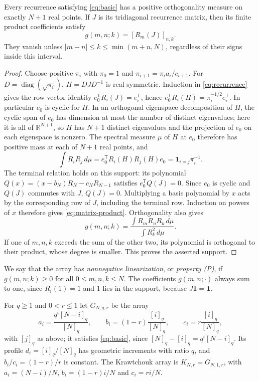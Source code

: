 \begin{lemma}\label{lem:finite}
Every recurrence satisfying \eqref{eq:basic} has a positive orthogonality measure on exactly $N+1$ real points. If $J$ is its tridiagonal recurrence matrix, then its finite product coefficients satisfy
\begin{equation}\label{eq:matrix-product}
g(m,n;k)=[R_m(J)]_{n,k}.
\end{equation}
They vanish unless $|m-n|\leq k\leq\min(m+n,N)$, regardless of their signs inside this interval.
\end{lemma}
\begin{proof}
Choose positive $\pi_i$ with $\pi_0=1$ and $\pi_{i+1}=\pi_i a_i/c_{i+1}$. For $D=\operatorname{diag}(\sqrt{\pi_i})$, $H=DJD^{-1}$ is real symmetric. Induction in \eqref{eq:recurrence} gives the row-vector identity $e_0^\mathsf T R_i(J)=e_i^\mathsf T$, hence $e_0^\mathsf T R_i(H)=\pi_i^{-1/2}e_i^\mathsf T$. In particular $e_0$ is cyclic for $H$. In an orthogonal eigenspace decomposition of $H$, the cyclic span of $e_0$ has dimension at most the number of distinct eigenvalues; here it is all of $\mathbb R^{N+1}$, so $H$ has $N+1$ distinct eigenvalues and the projection of $e_0$ on each eigenspace is nonzero. The spectral measure $\mu$ of $H$ at $e_0$ therefore has positive mass at each of $N+1$ real points, and
\[
\int R_iR_j\,d\mu=e_0^\mathsf TR_i(H)R_j(H)e_0
=\boldsymbol1_{i=j}\pi_i^{-1}.
\]
The terminal relation holds on this support: its polynomial $Q(x)=(x-b_N)R_N-c_NR_{N-1}$ satisfies $e_0^\mathsf TQ(J)=0$. Since $e_0$ is cyclic and $Q(J)$ commutes with $J$, $Q(J)=0$.
Multiplying a basis polynomial by $x$ acts by the corresponding row of $J$, including the terminal row. Induction on powers of $x$ therefore gives \eqref{eq:matrix-product}. Orthogonality also gives
\[
g(m,n;k)=\frac{\int R_mR_nR_k\,d\mu}{\int R_k^2\,d\mu}.
\]
If one of $m,n,k$ exceeds the sum of the other two, its polynomial is orthogonal to their product, whose degree is smaller. This proves the asserted support.
\end{proof}

We say that the array has \emph{nonnegative linearization}, or \emph{property (P)}, if $g(m,n;k)\geq0$ for all $0\leq m,n,k\leq N$. The coefficients $g(m,n;\cdot)$ always sum to one, since $R_i(1)=1$ and $1$ lies in the support, because $J\boldsymbol1=\boldsymbol1$.


For $q\geq1$ and $0<r\leq1$ let $G_{N,q,r}$ be the array
\begin{equation}\label{eq:parameters}
a_i=\frac{q^i[N-i]_q}{[N]_q},\qquad
b_i=(1-r)\frac{[i]_q}{[N]_q},\qquad
c_i=r\frac{[i]_q}{[N]_q},
\end{equation}
with $[j]_q$ as above; it satisfies \eqref{eq:basic}, since $[N]_q-[i]_q=q^i[N-i]_q$. Its profile $d_i=[i]_q/[N]_q$ has geometric increments with ratio $q$, and $b_i/c_i=(1-r)/r$ is constant. The Krawtchouk array is $K_{N,r}=G_{N,1,r}$, with $a_i=(N-i)/N$, $b_i=(1-r)i/N$ and $c_i=ri/N$.

